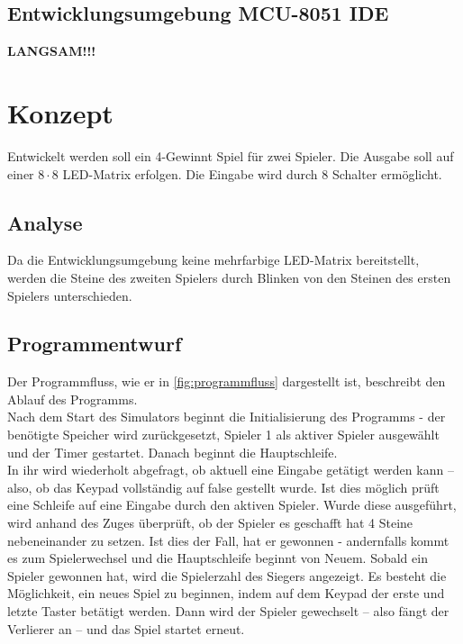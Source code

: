 \section{Entwicklungsumgebung MCU-8051 IDE}

\textbf{LANGSAM!!!}

\chapter{Konzept}

Entwickelt werden soll ein 4-Gewinnt Spiel für zwei Spieler.
Die Ausgabe soll auf einer $8 \cdot 8$ LED-Matrix erfolgen.
Die Eingabe wird durch 8 Schalter ermöglicht.

\section{Analyse}

Da die Entwicklungsumgebung keine mehrfarbige LED-Matrix bereitstellt, werden die Steine des zweiten Spielers durch Blinken von den Steinen des ersten Spielers unterschieden.

\section{Programmentwurf}

Der Programmfluss, wie er in \autoref{fig:programmfluss} dargestellt ist, beschreibt den Ablauf des Programms.\\
Nach dem Start des Simulators beginnt die Initialisierung des Programms - der benötigte Speicher wird zurückgesetzt, Spieler 1 als aktiver Spieler ausgewählt und der Timer gestartet. Danach beginnt die Hauptschleife.\\
In ihr wird wiederholt abgefragt, ob aktuell eine Eingabe getätigt werden kann -- also, ob das Keypad vollständig auf false gestellt wurde.
Ist dies möglich prüft eine Schleife auf eine Eingabe durch den aktiven Spieler.
Wurde diese ausgeführt, wird anhand des Zuges überprüft, ob der Spieler es geschafft hat 4 Steine nebeneinander zu setzen.
Ist dies der Fall, hat er gewonnen - andernfalls kommt es zum Spielerwechsel und die Hauptschleife beginnt von Neuem.
Sobald ein Spieler gewonnen hat, wird die Spielerzahl des Siegers angezeigt.
Es besteht die Möglichkeit, ein neues Spiel zu beginnen, indem auf dem Keypad der erste und letzte Taster betätigt werden.
Dann wird der Spieler gewechselt -- also fängt der Verlierer an -- und das Spiel startet erneut.

